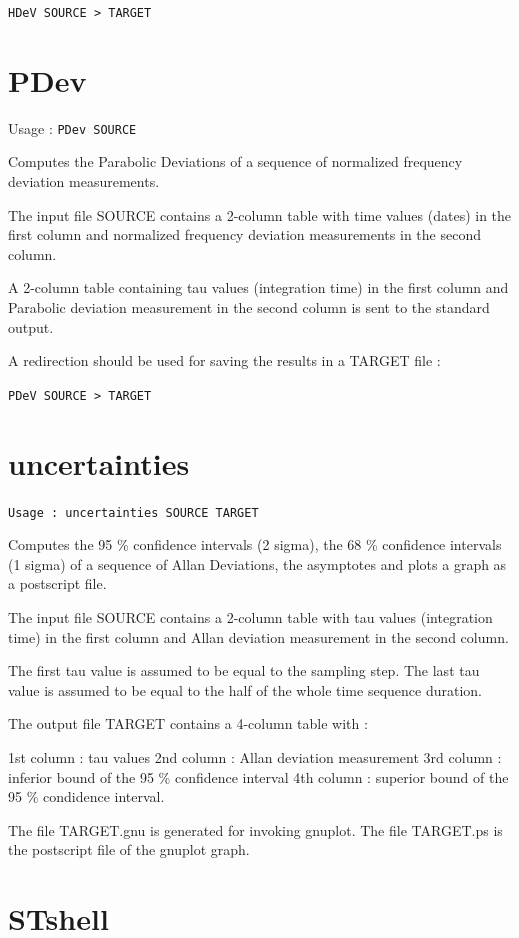 \documentclass[10pt,a4paper,french]{article}
\begin{document}
{\tt{HDeV SOURCE > TARGET}}

\section{PDev}

Usage : {\tt{PDev SOURCE}}

Computes the Parabolic Deviations of a sequence of normalized frequency deviation measurements.

The input file SOURCE contains a 2-column table with time values (dates) in the first column and normalized frequency deviation measurements in the second column.

A 2-column table containing tau values (integration time) in the first column and Parabolic deviation measurement in the second column is sent to the standard output.

A redirection should be used for saving the results in a TARGET file : 

{\tt{PDeV SOURCE > TARGET}}

\section{uncertainties}

{\tt{Usage : uncertainties SOURCE TARGET}}

Computes the 95 \% confidence intervals (2 sigma), the 68 \% confidence intervals (1 sigma) of a sequence of Allan Deviations, the asymptotes and plots a graph as a postscript file.

The input file SOURCE contains a 2-column table with tau values (integration time) in the first column and Allan deviation measurement in the second column.

The first tau value is assumed to be equal to the sampling step.
The last tau value is assumed to be equal to the half of the whole time sequence duration.

The output file TARGET contains a 4-column table with :

    1st column : tau values
    2nd column : Allan deviation measurement
    3rd column : inferior bound of the 95 \% confidence interval
    4th column : superior bound of the 95 \% condidence interval.

The file TARGET.gnu is generated for invoking gnuplot.
The file TARGET.ps is the postscript file of the gnuplot graph.

\section{STshell}
\end{document}
